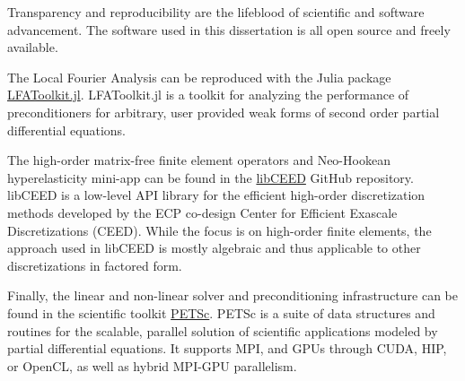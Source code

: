 Transparency and reproducibility are the lifeblood of scientific and software advancement.
The software used in this dissertation is all open source and freely available.

The Local Fourier Analysis can be reproduced with the Julia package \href{https://www.github.com/jeremylt/LFAToolkit.jl}{LFAToolkit.jl}. LFAToolkit.jl is a toolkit for analyzing the performance of preconditioners for arbitrary, user provided weak forms of second order partial differential equations.

The high-order matrix-free finite element operators and Neo-Hookean hyperelasticity mini-app can be found in the \href{https://www.github.com/CEED/libCEED}{libCEED} GitHub repository.
libCEED is a low-level API library for the efficient high-order discretization methods developed by the ECP co-design Center for Efficient Exascale Discretizations (CEED). While the focus is on high-order finite elements, the approach used in libCEED is mostly algebraic and thus applicable to other discretizations in factored form.

Finally, the linear and non-linear solver and preconditioning infrastructure can be found in the scientific toolkit \href{https://www.mcs.anl.gov/petsc/}{PETSc}.
PETSc is a suite of data structures and routines for the scalable, parallel solution of scientific applications modeled by partial differential equations. It supports MPI, and GPUs through CUDA, HIP, or OpenCL, as well as hybrid MPI-GPU parallelism.
